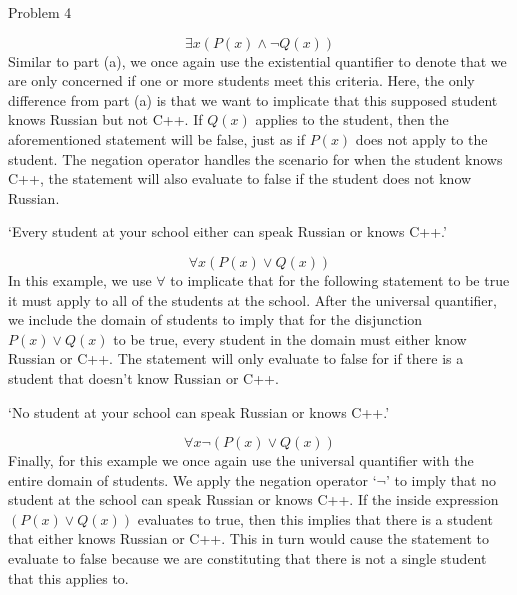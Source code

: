\begin{problem}{Problem 4}
\begin{highlight}
        \begin{equation}
            \exists x (P(x) \wedge \neg Q(x))
        \end{equation}
        Similar to part (a), we once again use the existential quantifier to denote that we are only concerned if one or more students meet this criteria. Here, the only difference from part (a) is that we want 
        to implicate that this supposed student knows Russian but not C++. If $Q(x)$ applies to the student, then the aforementioned statement will be false, just as if $P(x)$ does not apply to the student. The 
        negation operator handles the scenario for when the student knows C++, the statement will also evaluate to false if the student does not know Russian.
    \end{highlight}

    \begin{highlight}
        `Every student at your school either can speak Russian or knows C++.'

        \begin{equation}
            \forall x (P(x) \vee Q(x))
        \end{equation}
        In this example, we use $\forall$ to implicate that for the following statement to be true it must apply to all of the students at the school. After the universal quantifier, we include the domain of
        students to imply that for the disjunction $P(x) \vee Q(x)$ to be true, every student in the domain must either know Russian or C++. The statement will only evaluate to false for if there is a student
        that doesn't know Russian or C++.
    \end{highlight}

    \begin{highlight}
        `No student at your school can speak Russian or knows C++.'

        \begin{equation}
            \forall x \neg(P(x) \vee Q(x))
        \end{equation}
        Finally, for this example we once again use the universal quantifier with the entire domain of students. We apply the negation operator `$\neg$' to imply that no student at the school can speak Russian
        or knows C++. If the inside expression $(P(x) \vee Q(x))$ evaluates to true, then this implies that there is a student that either knows Russian or C++. This in turn would cause the statement to evaluate
        to false because we are constituting that there is not a single student that this applies to.
    \end{highlight}
\end{problem}

